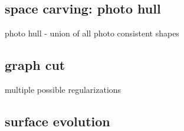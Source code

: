 \documentclass{article}
\begin{document}
\subsection{space carving: photo hull}
photo hull - union of all photo consistent shapes

\subsection{graph cut}
multiple possible regularizations



\subsection{surface evolution}
\end{document}
